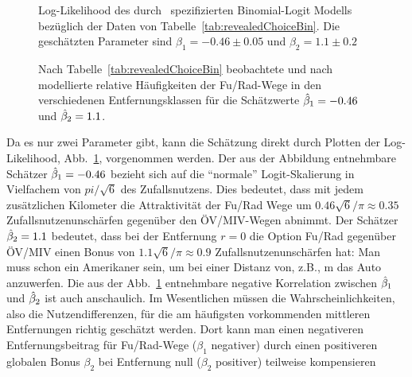 \begin{figure}
\caption{\label{fig:BNL-Entfernung-2007-2011-logL}Log-Likelihood des
  durch~ spezifizierten Binomial-Logit
  Modells bez\"uglich der Daten von
  Tabelle~\ref{tab:revealedChoiceBin}.
Die gesch\"atzten
Parameter sind $\beta_1=-0.46 \pm 0.05$ und
$\beta_2=1.1 \pm 0.2$
}
\end{figure}


\begin{figure}
\caption{\label{fig:BNL-Entfernung-2007-2011-relHaeuf}Nach
  Tabelle~\ref{tab:revealedChoiceBin} beobachtete und
  nach~ modellierte relative
  H\"aufigkeiten der Fu\3/Rad-Wege in den verschiedenen
  Entfernungsklassen f\"ur die Sch\"atzwerte $\hat{\beta}_1=-0.46$ und $\hat{\beta}_2=1.1$.
}
\end{figure}

Da es nur zwei Parameter gibt, kann die Sch\"atzung direkt durch
Plotten der Log-Likelihood,
Abb.~\ref{fig:BNL-Entfernung-2007-2011-logL},
 vorgenommen werden.
Der aus der Abbildung entnehmbare Sch\"at\-zer $\hat{\beta}_1=-0.46$
bezieht sich auf die ``normale'' Logit-Skalierung in Vielfachem von
$pi/\sqrt{6}$ des Zufallsnutzens. Dies bedeutet, dass mit jedem zus\"atzlichen Kilometer die Attraktivit\"at der
Fu\3/Rad Wege um $0.46 \sqrt{6}/\pi \approx 0.35$
Zufallsnutzenunsch\"arfen gegen\"uber den
\"OV/MIV-Wegen abnimmt. Der Sch\"atzer $\hat{\beta}_2=1.1$ bedeutet, dass
bei der Entfernung $r=0$ die Option Fu\3/Rad gegen\"uber \"OV/MIV
einen Bonus von $1.1 \sqrt{6}/\pi \approx 0.9$
Zufallsnutzenunsch\"arfen hat: Man muss schon ein Amerikaner sein, um
bei einer Distanz von, z.B., \unit[100]{m} das Auto anzuwerfen.
Die aus der Abb.~\ref{fig:BNL-Entfernung-2007-2011-logL} entnehmbare
negative Korrelation zwischen $\hat{\beta}_1$ und $\hat{\beta}_2$ ist auch
anschaulich. Im Wesentlichen m\"ussen die Wahrscheinlichkeiten, also
die Nutzendifferenzen, f\"ur die am h\"aufigsten vorkommenden
mittleren Entfernungen richtig gesch\"atzt werden. Dort kann man einen
negativeren Entfernungsbeitrag f\"ur Fu\3/Rad-Wege ($\beta_1$
negativer) durch einen
positiveren globalen Bonus $\beta_2$ bei Entfernung null ($\beta_2$
positiver) teilweise kompensieren

